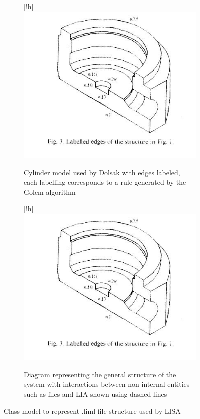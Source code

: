 \documentclass{article}
\begin{document}
\begin{figure}
\centering
\begin{subfigure}{.5\textwidth}[!h]
  \centering
  \includegraphics[width=0.9\linewidth]{DolsakCylinderWithEdges.jpeg}
  \caption{Cylinder model used by Dolsak with edges labeled, each labelling corresponds to a rule generated by the Golem algorithm \cite{DolsakPaper91}}
  \label{fig:sub1}
\end{subfigure}%
\begin{subfigure}{.5\textwidth}[!h]
  \centering
  \includegraphics[width=0.9\linewidth]{DolsakCylinderWithEdges.jpeg}
  \caption{Diagram representing the general structure of the system with interactions between non internal entities such as files and LIA shown using dashed lines}
  \label{fig:sub2}
\end{subfigure}
\label{fig:test}
\caption{Class model to represent .liml file structure used by LISA}
\end{figure}
\end{document}
